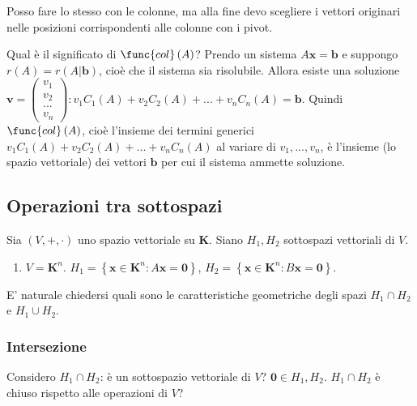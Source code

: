 \documentclass{article}
\begin{document}
\begin{description}
\item Posso fare lo stesso con le colonne, ma alla fine devo scegliere i
vettori originari nelle posizioni corrispondenti alle colonne con i pivot.

\item[-] Qual \`{e} il significato di $\func{col}\left( A\right) $? Prendo
un sistema $A\mathbf{x=b}$ e suppongo $r\left( A\right) =r\left( A|\mathbf{b}%
\right) $, cio\`{e} che il sistema sia risolubile. Allora esiste una
soluzione $\mathbf{v}=\left( 
\begin{array}{c}
v_{1} \\ 
v_{2} \\ 
... \\ 
v_{n}%
\end{array}%
\right) :v_{1}C_{1}\left( A\right) +v_{2}C_{2}\left( A\right)
+...+v_{n}C_{n}\left( A\right) =\mathbf{b}$. Quindi $\func{col}\left(
A\right) $, cio\`{e} l'insieme dei termini generici $v_{1}C_{1}\left(
A\right) +v_{2}C_{2}\left( A\right) +...+v_{n}C_{n}\left( A\right) $ al
variare di $v_{1},...,v_{n}$, \`{e} l'insieme (lo spazio vettoriale) dei
vettori $\mathbf{b}$ per cui il sistema ammette soluzione.
\end{description}

\subsection{Operazioni tra sottospazi}

Sia $\left( V,+,\cdot \right) $ uno spazio vettoriale su $\mathbf{K}$. Siano 
$H_{1},H_{2}$ sottospazi vettoriali di $V$.

\begin{enumerate}
\item $V=\mathbf{K}^{n}$. $H_{1}=\left\{ \mathbf{x\in K}^{n}:A\mathbf{x=0}%
\right\} $, $H_{2}=\left\{ \mathbf{x\in K}^{n}:B\mathbf{x=0}\right\} $.
\end{enumerate}

E' naturale chiedersi quali sono le caratteristiche geometriche degli spazi $%
H_{1}\cap H_{2}$ e $H_{1}\cup H_{2}$.

\subsubsection{Intersezione}

Considero $H_{1}\cap H_{2}$: \`{e} un sottospazio vettoriale di $V$? $%
\mathbf{0}\in H_{1},H_{2}$. $H_{1}\cap H_{2}$ \`{e} chiuso rispetto alle
operazioni di $V$?
\end{document}
